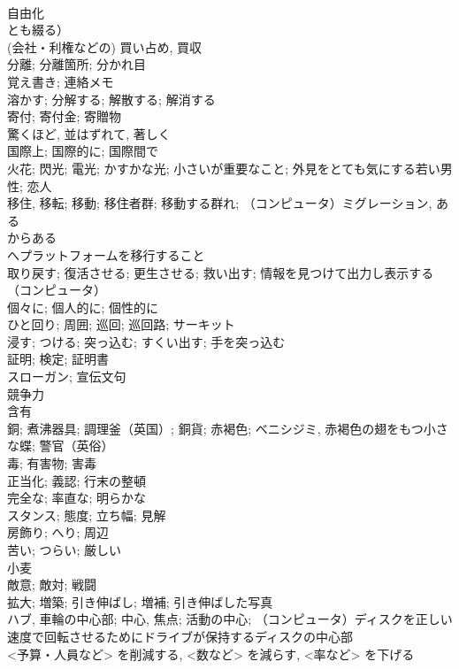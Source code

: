 \documentclass[8pt]{extreport}
\begin{document}
\begin{CJK}{UTF8}{min}
\\	自由化
\\	とも綴る）	
\\	(会社・利権などの) 買い占め, 買収	
\\	分離; 分離箇所; 分かれ目	
\\	覚え書き; 連絡メモ	
\\	溶かす; 分解する; 解散する; 解消する	
\\	寄付; 寄付金; 寄贈物	
\\	驚くほど, 並はずれて, 著しく	
\\	国際上; 国際的に; 国際間で	
\\	火花; 閃光; 電光; かすかな光; 小さいが重要なこと; 外見をとても気にする若い男性; 恋人	
\\	移住, 移転; 移動; 移住者群; 移動する群れ; （コンピュータ）ミグレーション, ある
\\	からある
\\	へプラットフォームを移行すること	
\\	取り戻す; 復活させる; 更生させる; 救い出す; 情報を見つけて出力し表示する（コンピュータ）	
\\	個々に; 個人的に; 個性的に	
\\	ひと回り; 周囲; 巡回; 巡回路; サーキット	
\\	浸す; つける; 突っ込む; すくい出す; 手を突っ込む	
\\	証明; 検定; 証明書	
\\	スローガン; 宣伝文句	
\\	競争力	
\\	含有	
\\	銅; 煮沸器具; 調理釜（英国）; 銅貨; 赤褐色; ベニシジミ, 赤褐色の翅をもつ小さな蝶; 警官（英俗）	
\\	毒; 有害物; 害毒	
\\	正当化; 義認; 行末の整頓	
\\	完全な; 率直な; 明らかな	
\\	スタンス; 態度; 立ち幅; 見解	
\\	房飾り; へり; 周辺	
\\	苦い; つらい; 厳しい	
\\	小麦	
\\	敵意; 敵対; 戦闘	
\\	拡大; 増築; 引き伸ばし; 増補; 引き伸ばした写真	
\\	ハブ, 車輪の中心部; 中心, 焦点; 活動の中心; （コンピュータ）ディスクを正しい速度で回転させるためにドライブが保持するディスクの中心部	
\\	<予算・人員など> を削減する, <数など> を減らす, <率など> を下げる	

\end{CJK}
\end{document}
